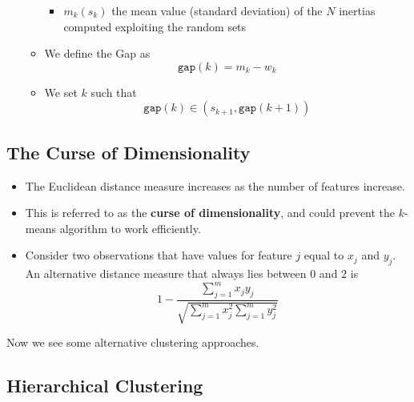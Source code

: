 \begin{itemize}
\begin{itemize}
\begin{itemize}
            \item $m_{k}(s_{k})$ the mean value (standard deviation) of the $N$ inertias computed exploiting the random sets
        \end{itemize}
        \item We define the Gap as
        \begin{equation*}
            \texttt{gap}(k) = m_{k} - w_{k}
        \end{equation*}
        \item We set $k$ such that
        \begin{equation*}
            \texttt{gap}(k) \in (s_{k+1},\texttt{gap}(k+1))
        \end{equation*}
    \end{itemize}
\end{itemize}

\subsection{The Curse of Dimensionality}

\begin{itemize}
    \item The Euclidean distance measure increases as the number of features increase.
    \item This is referred to as the \textbf{curse of dimensionality}, and could prevent the $k$-means algorithm to work efficiently.
    \item Consider two observations that have values for feature $j$ equal to $x_{j}$ and $y_{j}$. An alternative distance measure that always lies between $0$ and $2$ is
    \begin{equation*}
        1-\frac{\sum _{j=1}^{m} x_{j} y_{j}}{\sqrt{\sum _{j=1}^{m} x_{j}^{2}\sum _{j=1}^{m} y_{j}^{2}}}
    \end{equation*}
\end{itemize}

Now we see some alternative clustering approaches.

\subsection{Hierarchical Clustering}


